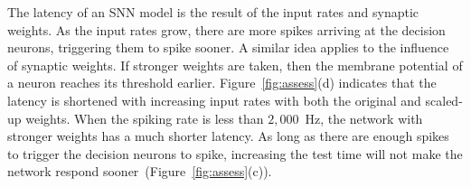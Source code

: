 \documentclass{frontiersENG} %
\begin{document}
The latency of an SNN model is the result of the input rates and synaptic weights.
As the input rates grow, there are more spikes arriving at the decision neurons, triggering them to spike sooner.
A similar idea applies to the influence of synaptic weights.
If stronger weights are taken, then the membrane potential of a neuron reaches its threshold earlier.
Figure~\ref{fig:assess}(d) indicates that the latency is shortened with increasing input rates with both the original and scaled-up weights.
When the spiking rate is less than $2,000$~Hz, the network with stronger weights has a much shorter latency.
As long as there are enough spikes to trigger the decision neurons to spike, increasing the test time will not make the network respond sooner~(Figure~\ref{fig:assess}(c)).
\end{document}
